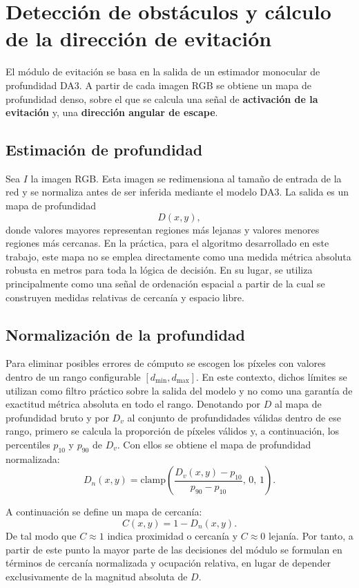 \section{Detección de obstáculos y cálculo de la dirección de evitación}
El módulo de evitación se basa en la salida de un estimador monocular de profundidad DA3. A partir de cada 
imagen RGB se obtiene un mapa de profundidad denso, sobre el que se calcula una señal de 
\textbf{activación de la evitación} y, una \textbf{dirección angular de escape}.

\subsection{Estimación de profundidad}
Sea \(I\) la imagen RGB. Esta imagen se redimensiona al tamaño de entrada de la red y se normaliza 
antes de ser inferida mediante el modelo DA3. La salida es un mapa de profundidad
\[D(x,y),\]
donde valores mayores representan regiones más lejanas y valores menores regiones más cercanas. En la práctica, para el algoritmo desarrollado en este trabajo, este mapa no se emplea directamente como una medida métrica absoluta robusta en metros para toda la lógica de decisión. En su lugar, se utiliza principalmente como una señal de ordenación espacial a partir de la cual se construyen medidas relativas de cercanía y espacio libre.

\subsection{Normalización de la profundidad}
Para eliminar posibles errores de cómputo se escogen los píxeles con valores dentro de un rango configurable \([d_{\min}, d_{\max}]\). En este contexto, dichos límites se utilizan como filtro práctico sobre la salida del modelo y no como una garantía de exactitud métrica absoluta en todo el rango. Denotando por \(D\) al mapa de profundidad bruto y por \(D_v\) al conjunto de profundidades válidas dentro de ese rango, primero se calcula la proporción de píxeles válidos y, a continuación, los percentiles \(p_{10}\) y \(p_{90}\) de \(D_v\). Con ellos se obtiene el mapa de profundidad normalizada:
\[
D_n(x,y) = \mathrm{clamp}\!\left(\frac{D_v(x,y) - p_{10}}{p_{90} - p_{10}},\, 0,\, 1\right).
\]

A continuación se define un mapa de cercanía:
\[C(x,y) = 1 - D_n(x,y).\]
De tal modo que \(C\approx 1\) indica proximidad o cercanía y \(C\approx 0\) lejanía. Por tanto, a partir de este punto la mayor parte de las decisiones del módulo se formulan en términos de cercanía normalizada y ocupación relativa, en lugar de depender exclusivamente de la magnitud absoluta de \(D\).

